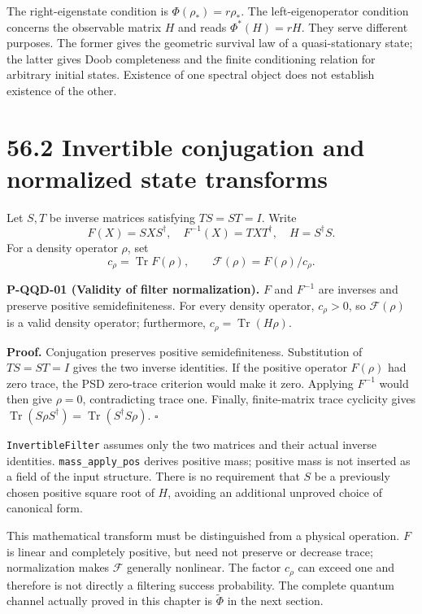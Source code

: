 \documentclass[
  11pt,
  oneside]{book}
\begin{document}
The right-eigenstate condition is \(\Phi(\rho_*)=r\rho_*\). The
left-eigenoperator condition concerns the observable matrix \(H\) and
reads \(\Phi^*(H)=rH\). They serve different purposes. The former gives
the geometric survival law of a quasi-stationary state; the latter gives
Doob completeness and the finite conditioning relation for arbitrary
initial states. Existence of one spectral object does not establish
existence of the other.

\section{56.2 Invertible conjugation and normalized state transforms}

Let \(S,T\) be inverse matrices satisfying \(TS=ST=I\). Write \[
F(X)=SXS^\dagger,\quad F^{-1}(X)=TXT^\dagger,
\quad H=S^\dagger S.
\] For a density operator \(\rho\), set \[
c_\rho=\operatorname{Tr}F(\rho),\qquad
\mathcal F(\rho)=F(\rho)/c_\rho.
\]

\label{p-qqd-01}{}

\textbf{P-QQD-01 (Validity of filter normalization).} \(F\) and
\(F^{-1}\) are inverses and preserve positive semidefiniteness. For
every density operator, \(c_\rho>0\), so \(\mathcal F(\rho)\) is a valid
density operator; furthermore, \(c_\rho=\operatorname{Tr}(H\rho)\).

\textbf{Proof.} Conjugation preserves positive semidefiniteness.
Substitution of \(TS=ST=I\) gives the two inverse identities. If the
positive operator \(F(\rho)\) had zero trace, the PSD zero-trace
criterion would make it zero. Applying \(F^{-1}\) would then give
\(\rho=0\), contradicting trace one. Finally, finite-matrix trace
cyclicity gives
\(\operatorname{Tr}(S\rho S^\dagger)=\operatorname{Tr}(S^\dagger S\rho)\).
\(\square\)

\texttt{Invertible\allowbreak Filter} assumes only the two matrices and their actual
inverse identities. \texttt{mass\_\allowbreak apply\_\allowbreak pos} derives positive mass;
positive mass is not inserted as a field of the input structure. There
is no requirement that \(S\) be a previously chosen positive square root
of \(H\), avoiding an additional unproved choice of canonical form.

This mathematical transform must be distinguished from a physical
operation. \(F\) is linear and completely positive, but need not
preserve or decrease trace; normalization makes \(\mathcal F\) generally
nonlinear. The factor \(c_\rho\) can exceed one and therefore is not
directly a filtering success probability. The complete quantum channel
actually proved in this chapter is \(\widetilde\Phi\) in the next
section.
\end{document}
